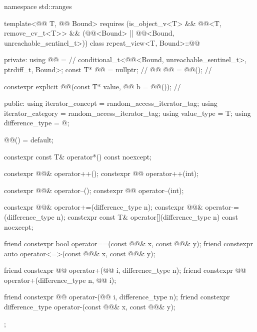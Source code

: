 %
\begin{codeblock}
namespace std::ranges {
  template<@@ T, @@ Bound>
    requires (is_object_v<T> && @@<T, remove_cv_t<T>> &&
              (@@<Bound> ||
               @@<Bound, unreachable_sentinel_t>))
  class repeat_view<T, Bound>::@@ {
  private:
    using @@ =                          // \expos
      conditional_t<@@<Bound, unreachable_sentinel_t>, ptrdiff_t, Bound>;
    const T* @@ = nullptr;                  // \expos
    @@ @@ = @@();         // \expos

    constexpr explicit @@(const T* value, @@ b = @@());   // \expos

  public:
    using iterator_concept = random_access_iterator_tag;
    using iterator_category = random_access_iterator_tag;
    using value_type = T;
    using difference_type = @\seebelow@;

    @@() = default;

    constexpr const T& operator*() const noexcept;

    constexpr @@& operator++();
    constexpr @@ operator++(int);

    constexpr @@& operator--();
    constexpr @@ operator--(int);

    constexpr @@& operator+=(difference_type n);
    constexpr @@& operator-=(difference_type n);
    constexpr const T& operator[](difference_type n) const noexcept;

    friend constexpr bool operator==(const @@& x, const @@& y);
    friend constexpr auto operator<=>(const @@& x, const @@& y);

    friend constexpr @@ operator+(@@ i, difference_type n);
    friend constexpr @@ operator+(difference_type n, @@ i);

    friend constexpr @@ operator-(@@ i, difference_type n);
    friend constexpr difference_type operator-(const @@& x, const @@& y);
  };
}
\end{codeblock}

